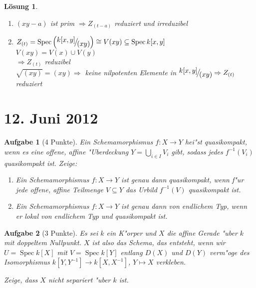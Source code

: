 \documentclass[paper = A4, fontsize=12pt, numbers=noendperiod, chapterprefix=true]{scrbook}
\theoremstyle{break}
\newtheorem{Aufg}{Aufgabe}
\newtheorem{Loes}{L\"osung}
\theoremstyle{nonumberbreak}
\theoremstyle{nonumberplain}
\DeclareMathOperator{\Spec}{Spec}
\newcommand{\FakRaum}[2]{
  \raisebox{0.7ex}{\ensuremath{#1}}
  \ensuremath{\mkern-3mu}\big/\ensuremath{\mkern-3mu}
  \raisebox{-0.6ex}{\ensuremath{#2}}}
\begin{document}
\begin{Loes}
\begin{enumerate}[a)]
	\begin{enumerate}[\underline{$a=0$}:]
	\item[\underline{$a \ne 0$}:]
		$(xy-a)$ ist prim $\Rightarrow Z_{(t-a)}$ reduziert und irreduzibel
	\item[\underline{$a = 0$}:]
		$Z_{(t)} = \Spec \left( \FakRaum{k[x,y]}{(xy)} \right) \cong V(xy) \subseteq \Spec k[x,y]$\\
		$V(xy) = V(x) \cup V(y)$\\
		$\Rightarrow Z_{(t)}$ reduzibel\\
		$\sqrt{(xy)} = (xy) \Rightarrow$ keine nilpotenten Elemente in $\FakRaum{k[x,y]}{(xy)} \Rightarrow Z_{(t)}$ reduziert
	\end{enumerate}
\end{enumerate}\end{Loes}

\newpage
\section{12. Juni 2012}
\setcounter{Aufg}{0}
\setcounter{Loes}{0}

\begin{Aufg}[4 Punkte]
Ein Schemamorphismus $f \colon X \to Y$ hei"st {\em quasikompakt}, wenn es eine offene, affine "Uberdeckung $Y = \bigcup\limits_{i \in I} V_i$ gibt, sodass jedes $f^{-1}(V_i)$ quasikompakt ist. Zeige:
\begin{enumerate}%
\item Ein Schemamorphismus $f \colon X \to Y$ ist genau dann quasikompakt, wenn f"ur jede offene, affine Teilmenge $V \subseteq Y$ das Urbild $f^{-1}(V)$ quasikompakt ist.
\item Ein Schemamorphismus $f \colon X \to Y$ ist genau dann von endlichem Typ, wenn er lokal von endlichem Typ und quasikompakt ist.
\end{enumerate}
\end{Aufg}

\begin{Aufg}[3 Punkte]
Es sei $k$ ein K"orper und $X$ die affine Gerade "uber $k$ mit doppeltem Nullpunkt. $X$ ist also das Schema, das entsteht, wenn wir $U = \Spec k[X]$ mit $V = \Spec k[Y]$ entlang $D(X)$ und $D(Y)$ verm"oge des Isomorphismus $k[Y,Y^{-1}] \to k[X,X^{-1}]$, $Y\mapsto X$ verkleben.

Zeige, dass $X$ nicht separiert "uber $k$ ist.
\end{Aufg}
\end{document}
